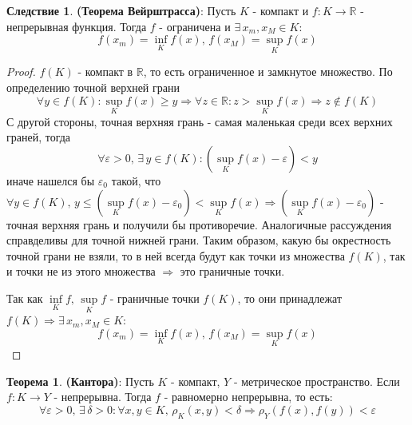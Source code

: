 \documentclass[12pt]{article}
\newcommand{\MR}{\mathbb{R}}
\newcommand{\VE}{\varepsilon}
\theoremstyle{definition}
\newtheorem{theorem}{Теорема}
\newtheorem{corollary}{Следствие}
\begin{document}
\begin{corollary}
	\textbf{(Теорема Вейрштрасса)}: Пусть $K$ - компакт и $f \colon K \to \MR$ - непрерывная функция. Тогда $f$ - ограничена и $\exists\, x_m, x_M \in K$: 
	$$
		f(x_m) = \inf\limits_{K}f(x), \, f(x_M) = \sup\limits_{K}f(x)
	$$
\end{corollary}
\begin{proof}
	$f(K)$ - компакт в $\MR$, то есть ограниченное и замкнутое множество. По определению точной верхней грани 
	$$
		\forall y \in f(K) \colon \sup\limits_{K}f(x) \geq y \Rightarrow \forall z \in \MR \colon z > \sup\limits_{K}f(x) \Rightarrow z \notin f(K)
	$$ 
	С другой стороны, точная верхняя грань - самая маленькая среди всех верхних граней, тогда $$
		\forall \VE > 0, \, \exists \, y \in f(K) \colon (\sup\limits_{K}f(x) - \VE) < y
	$$ 
	иначе нашелся бы $\VE_0$ такой, что $\forall y \in f(K), \, y \leq (\sup\limits_{K}f(x) - \VE_0) < \sup\limits_{K}f(x) \Rightarrow (\sup\limits_{K}f(x) - \VE_0)$ - точная верхняя грань и получили бы противоречие. Аналогичные рассуждения справделивы для точной нижней грани. Таким образом, какую бы окрестность точной грани не взяли, то в ней всегда будут как точки из множества $f(K)$, так и точки не из этого множества $\Rightarrow$ это граничные точки.
	
	Так как $\inf\limits_{K}f, \, \sup\limits_{K}f$ - граничные точки $f(K)$, то они принадлежат $f(K) \Rightarrow \exists\, x_m, x_M \in K$:
	$$
		f(x_m) = \inf\limits_{K}f(x), \, f(x_M) = \sup\limits_{K}f(x)
	$$
\end{proof}
\begin{theorem}
	\textbf{(Кантора)}: Пусть $K$ - компакт, $Y$ - метрическое пространство. Если $f\colon K \to Y$ - непрерывна. Тогда $f$ - равномерно непрерывна, то есть:
	$$
		\forall \VE > 0, \, \exists \, \delta > 0 \colon \forall x,y \in K, \, \rho_K(x,y) < \delta \Rightarrow \rho_Y(f(x),f(y)) < \VE 
	$$
\end{theorem}
\end{document}
